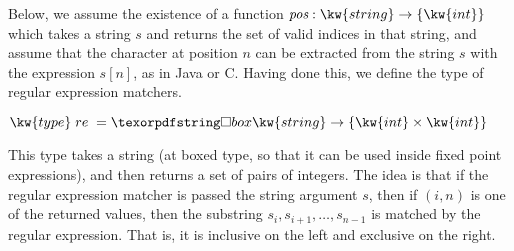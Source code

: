 Below, we assume the existence of a function
$\name{pos} : \kw{string} \to \tset{\kw{int}}$ which takes a string
$s$ and returns the set of valid indices in that string, and assume
that the character at position $n$ can be extracted from the string
$s$ with the expression $s[n]$, as in Java or C. Having done this, we define
the type of regular expression matchers.
\begin{tabbing} 
\qquad  $\kw{type}\;re\;=\iso \kw{string} \to \tset{\kw{int} \times \kw{int}}$  
\end{tabbing}
This type takes a string (at boxed type, so that it can be used inside
fixed point expressions), and then returns a set of pairs of integers. The
idea is that if the regular expression matcher is passed the string
argument $s$, then if $(i, n)$ is one of the returned values, then the
substring $s_i, s_{i+1}, \ldots, s_{n-1}$ is matched by the regular expression.
That is, it is inclusive on the left and exclusive on the right. 

